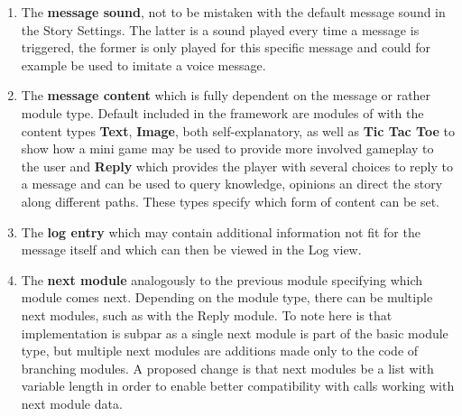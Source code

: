 \begin{enumerate}
\item The \textbf{message sound}, not to be mistaken with the default message sound in the Story Settings. The latter is a sound played every time a message is triggered, the former is only played for this specific message and could for example be used to imitate a voice message.
\item The \textbf{message content} which is fully dependent on the message or rather module type. Default included in the framework are modules of with the content types \textbf{Text}, \textbf{Image}, both self-explanatory, as well as \textbf{Tic Tac Toe} to show how a mini game may be used to provide more involved gameplay to the user and \textbf{Reply} which provides the player with several choices to reply to a message and can be used to query knowledge, opinions an direct the story along different paths. These types specify which form of content can be set.
\item The \textbf{log entry} which may contain additional information not fit for the message itself and which can then be viewed in the Log view.
\item The \textbf{next module} analogously to the previous module specifying which module comes next. Depending on the module type, there can be multiple next modules, such as with the Reply module. To note here is that implementation is subpar as a single next module is part of the basic module type, but multiple next modules are additions made only to the code of branching modules. A proposed change is that next modules be a list with variable length in order to enable better compatibility with calls working with next module data.
\end{enumerate}

